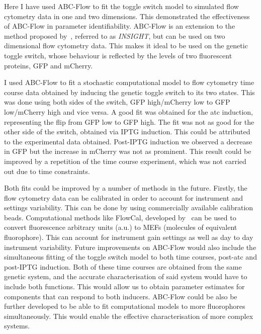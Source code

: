 Here I have used ABC-Flow to fit the toggle switch model to simulated flow cytometry data in one and two dimensions. This demonstrated the effectiveness of ABC-Flow in parameter identifiability. ABC-Flow is an extension to the method proposed by~\textcite{Lillacci:2013hu}, referred to as \textit{INSIGHT}, but can be used on two dimensional flow cytometry data. This makes it ideal to be used on the genetic toggle switch, whose behaviour is reflected by the levels of two fluorescent proteins, GFP and mCherry.


I used ABC-Flow to fit a stochastic computational model to flow cytometry  time course data obtained by inducing the genetic toggle switch to its two states. This was done using both sides of the switch, GFP high/mCherry low to GFP low/mCherry high and vice versa. A good fit was obtained for the \acrshort{atc} induction, representing the flip from GFP low to GFP high. The fit was not as good for the other side of the switch, obtained via IPTG induction. This could be attributed to the experimental data obtained. Post-IPTG induction we observed a decrease in GFP but the increase in mCherry was not as prominent. This result could be improved by a repetition of the time course experiment, which was not carried out due to time constraints.

Both fits could be improved by a number of methods in the future. Firstly, the flow cytometry data can be calibrated in order to account for instrument and settings variability. This can be done by using commercially available calibration beads. Computational methods like FlowCal, developed by~\textcite{Tabor:2009bz} can be used to convert fluorescence arbitrary units (a.u.) to MEFs (molecules of equivalent fluorophore). This can account for instrument gain settings as well as day to day instrument variability. Future improvements on ABC-Flow would also include the simultaneous fitting of the toggle switch model to both time courses, post-\acrshort{atc} and post-IPTG induction. Both of these time courses are obtained from the same genetic system, and the accurate characterisation of said system would have to include both functions. This would allow us to obtain parameter estimates for components that can respond to both inducers. ABC-Flow could be also be further developed to be able to fit computational models to more fluorophores simultaneously. This would enable the effective characterisation of more complex systems.




